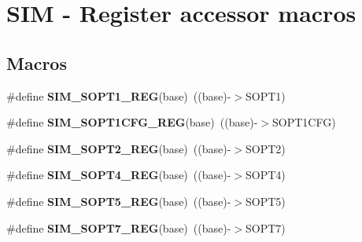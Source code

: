\hypertarget{group___s_i_m___register___accessor___macros}{}\section{S\+IM -\/ Register accessor macros}
\label{group___s_i_m___register___accessor___macros}
\subsection*{Macros}
\begin{DoxyCompactItemize}
\item 
\mbox{\label{group___s_i_m___register___accessor___macros_ga3b7afc5db335a5be8aaa37f7fbecff72}} 
\#define {\bfseries S\+I\+M\+\_\+\+S\+O\+P\+T1\+\_\+\+R\+EG}(base)~((base)-\/$>$S\+O\+P\+T1)
\item 
\mbox{\label{group___s_i_m___register___accessor___macros_ga4c047f7ef6bc896bec677567db485e0c}} 
\#define {\bfseries S\+I\+M\+\_\+\+S\+O\+P\+T1\+C\+F\+G\+\_\+\+R\+EG}(base)~((base)-\/$>$S\+O\+P\+T1\+C\+FG)
\item 
\mbox{\label{group___s_i_m___register___accessor___macros_ga49ff604bc1be3844a25f00a1a6b7649d}} 
\#define {\bfseries S\+I\+M\+\_\+\+S\+O\+P\+T2\+\_\+\+R\+EG}(base)~((base)-\/$>$S\+O\+P\+T2)
\item 
\mbox{\label{group___s_i_m___register___accessor___macros_gaf236970c4ed2d9aa01898ca0f361b6e5}} 
\#define {\bfseries S\+I\+M\+\_\+\+S\+O\+P\+T4\+\_\+\+R\+EG}(base)~((base)-\/$>$S\+O\+P\+T4)
\item 
\mbox{\label{group___s_i_m___register___accessor___macros_gac3deed6e684a7bdf2dcb7559e1f183c0}} 
\#define {\bfseries S\+I\+M\+\_\+\+S\+O\+P\+T5\+\_\+\+R\+EG}(base)~((base)-\/$>$S\+O\+P\+T5)
\item 
\mbox{\label{group___s_i_m___register___accessor___macros_ga1859f3465bc7759ea1727d66791a4c27}} 
\#define {\bfseries S\+I\+M\+\_\+\+S\+O\+P\+T7\+\_\+\+R\+EG}(base)~((base)-\/$>$S\+O\+P\+T7)

\end{DoxyCompactItemize}
